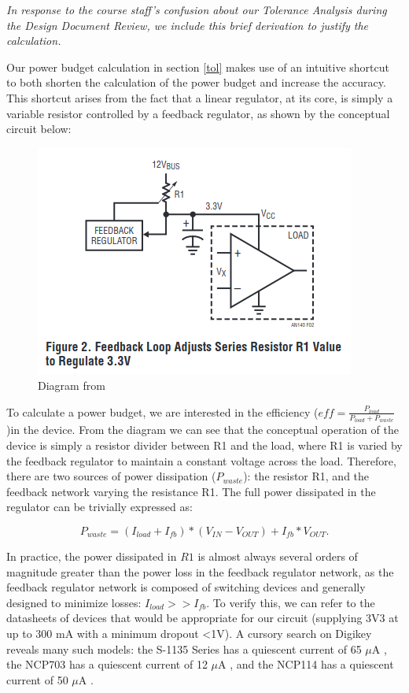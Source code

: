 \documentclass{article}
\begin{document}
\textit{In response to the course staff's confusion about our Tolerance Analysis during the Design Document Review, we include this brief derivation to justify the calculation. }

Our power budget calculation in section \ref{tol} makes use of an intuitive shortcut to both shorten the calculation of the power budget and increase the accuracy. This shortcut arises from the fact that a linear regulator, at its core, is simply a variable resistor controlled by a feedback regulator, as shown by the conceptual circuit below: \cite{AD-linreg}

\begin{center}
	\begin{figure}[H]
		\centering
		\includegraphics[width= 0.25 \textwidth]{linear_reg_diagram.png}
		\caption{Diagram from \cite{AD-linreg}} \label{linear_reg_diagram}
	\end{figure}
\end{center}

To calculate a power budget, we are interested in the efficiency ($eff = \frac{P_{load}}{P_{load} + P_{waste} } $)in the device. From the diagram we can see that the conceptual operation of the device is simply a resistor divider between R1 and the load, where R1 is varied by the feedback regulator to maintain a constant voltage across the load. Therefore, there are two sources of power dissipation ($P_{waste}$): the resistor R1, and the feedback network varying the resistance R1. The full power dissipated in the regulator can be trivially expressed as:

$$
P_{waste} = (I_{load} + I_{fb})*(V_{IN} - V_{OUT})+ I_{fb}*V_{OUT}. 
$$

In practice, the power dissipated in $R1$ is almost always several orders of magnitude greater than the power loss in the feedback regulator network, as the feedback regulator network is composed of switching devices and generally designed to minimize losses: $I_{load} >> I_{fb}$. To verify this, we can refer to the datasheets of devices that would be appropriate for our circuit (supplying 3V3 at up to 300 mA with a minimum dropout <1V). A cursory search on Digikey reveals many such models: the S-1135 Series has a quiescent current of 65 $\mu$A \cite{s-1135}, the NCP703 has a quiescent current of 12 $\mu$A \cite{ncp703}, and the NCP114 has a quiescent current of 50 $\mu$A \cite{ncp114}. 
\end{document}
